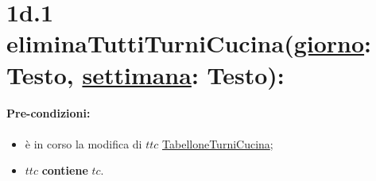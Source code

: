 {\begin{itemize}
\end{itemize}

\section*{1d.1 eliminaTuttiTurniCucina(\underline{giorno}: Testo, \underline{settimana}: Testo):}

\paragraph{Pre-condizioni:}
\begin{itemize}
 \item è in corso la modifica di $ttc$ \underline{TabelloneTurniCucina};
 \item $ttc$ \textbf{contiene} $tc$.
\end{itemize}

}
